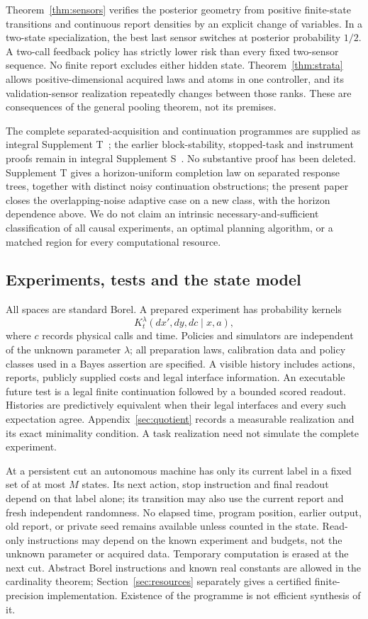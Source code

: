 Theorem~\ref{thm:sensors} verifies the posterior geometry from positive finite-state transitions and continuous report densities by an explicit change of variables. In a two-state specialization, the best last sensor switches at posterior probability $1/2$. A two-call feedback policy has strictly lower risk than every fixed two-sensor sequence. No finite report excludes either hidden state. Theorem~\ref{thm:strata} allows positive-dimensional acquired laws and atoms in one controller, and its validation-sensor realization repeatedly changes between those ranks. These are consequences of the general pooling theorem, not its premises.

The complete separated-acquisition and continuation programmes are supplied as integral Supplement T~\cite{retained}; the earlier block-stability, stopped-task and instrument proofs remain in integral Supplement S~\cite{companion}. No substantive proof has been deleted. Supplement T gives a horizon-uniform completion law on separated response trees, together with distinct noisy continuation obstructions; the present paper closes the overlapping-noise adaptive case on a new class, with the horizon dependence above. We do not claim an intrinsic necessary-and-sufficient classification of all causal experiments, an optimal planning algorithm, or a matched region for every computational resource.

\subsection{Experiments, tests and the state model}
All spaces are standard Borel. A prepared experiment has probability kernels
\[
 K_t^\lambda(dx',dy,dc\mid x,a),
\]
where $c$ records physical calls and time. Policies and simulators are independent of the unknown parameter $\lambda$; all preparation laws, calibration data and policy classes used in a Bayes assertion are specified. A visible history includes actions, reports, publicly supplied costs and legal interface information. An executable future test is a legal finite continuation followed by a bounded scored readout. Histories are predictively equivalent when their legal interfaces and every such expectation agree. Appendix~\ref{sec:quotient} records a measurable realization and its exact minimality condition. A task realization need not simulate the complete experiment.

At a persistent cut an autonomous machine has only its current label in a fixed set of at most $M$ states. Its next action, stop instruction and final readout depend on that label alone; its transition may also use the current report and fresh independent randomness. No elapsed time, program position, earlier output, old report, or private seed remains available unless counted in the state. Read-only instructions may depend on the known experiment and budgets, not the unknown parameter or acquired data. Temporary computation is erased at the next cut. Abstract Borel instructions and known real constants are allowed in the cardinality theorem; Section~\ref{sec:resources} separately gives a certified finite-precision implementation. Existence of the programme is not efficient synthesis of it.

